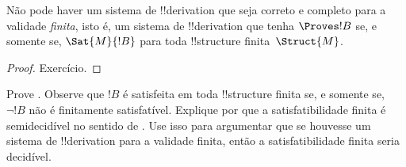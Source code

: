 \documentclass[../../../include/open-logic-section]{subfiles}
\begin{document}
\begin{cor}%
  Não pode haver um sistema de !!{derivation} que seja correto e
  completo para a validade \emph{finita}, isto é, um sistema de
  !!{derivation} que tenha $\Proves !B$ se, e somente se,
  $\Sat{M}{!B}$ para toda !!{structure} finita~$\Struct{M}$.
\end{cor}

\begin{proof}
  Exercício.
\end{proof}

\begin{prob}
  Prove . Observe que $!B$ é
  satisfeita em toda !!{structure} finita se, e somente se, $\lnot !B$
  não é finitamente satisfatível.  Explique por que a satisfatibilidade
  finita é semidecidível no sentido de
  . Use isso para argumentar que se
  houvesse um sistema de !!{derivation} para a validade finita, então
  a satisfatibilidade finita seria decidível.
\end{prob}
\end{document}
